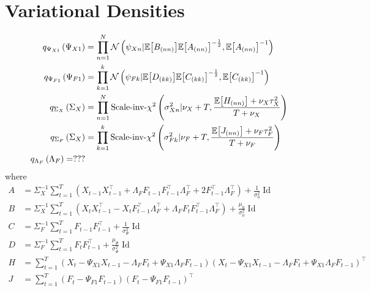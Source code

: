 \section{Variational Densities}
\begin{align}
	q_{\Psi_{X1}} \left( \Psi_{X1} \right) &= \prod_{n = 1}^N \mathcal N \left( \psi_{Xn} | \mathbb{E} \mleft[ B_{(nn)} \mright] \mathbb{E} \mleft[ A_{(nn)} \mright]^{-\frac12}, \mathbb{E} \mleft[ A_{(nn)} \mright]^{-1} \right) \\
	q_{\Psi_{F1}} \left( \Psi_{F1} \right) &= \prod_{k = 1}^k \mathcal N \left( \psi_{Fk} | \mathbb{E} \mleft[ D_{(kk)} \mright] \mathbb{E} \mleft[ C_{(kk)} \mright]^{-\frac12}, \mathbb{E} \mleft[ C_{(kk)} \mright]^{-1} \right) \\
	q_{\Sigma_X} \left( \Sigma_X \right) &= \prod_{n = 1}^N \text{Scale-inv-} \chi^2 \left( \sigma_{Xn}^2 | \nu_X + T, \frac{ \mathbb{E} \mleft[ H_{(nn)} \mright] + \nu_X \tau_X^2 }{ T + \nu_X } \right) \\
	q_{\Sigma_F} \left( \Sigma_X \right) &= \prod_{k = 1}^k \text{Scale-inv-} \chi^2 \left( \sigma_{Fk}^2 | \nu_F + T, \frac{ \mathbb{E} \mleft[ J_{(nn)} \mright] + \nu_F \tau_F^2 }{ T + \nu_F } \right) \\
	q_{\Lambda_F} \left( \Lambda_F \right) = ???
\end{align}
where 
\begin{align}
	A &= \Sigma_X^{-1} \sum_{t = 1}^T \left( X_{t-1} X_{t-1}^{\top} + \Lambda_F F_{t-1} F_{t-1}^{\top} \Lambda_F^{\top} + 2 F_{t-1}^{\top} \Lambda_F^{\top} \right) + \frac{1}{\sigma_0^2} \operatorname{Id} \\
	B &= \Sigma_X^{-1} \sum_{t = 1}^T \left( X_{t} X_{t-1}^{\top} - X_{t} F_{t-1}^{\top} \Lambda_F^{\top} + \Lambda_F F_{t} F_{t-1}^{\top} \Lambda_F^{\top} \right) + \frac{\mu_0}{\sigma_0^2}  \operatorname{Id} \\
	C &= \Sigma_F^{-1} \sum_{t = 1}^T F_{t-1} F_{t-1}^{\top} + \frac{1}{\sigma_{\Phi}^2} \operatorname{Id} \\
	D &= \Sigma_F^{-1} \sum_{t = 1}^T F_t F_{t-1}^\top + \frac{\mu_{\Phi}}{\sigma_{\Phi}^2} \operatorname{Id} \\
	H &=\sum_{t=1}^T \left( X_t - \Psi_{X1} X_{t-1} - \Lambda_F F_t + \Psi_{X1} \Lambda_F F_{t-1} \right)  \left( X_t - \Psi_{X1} X_{t-1} - \Lambda_F F_t + \Psi_{X1} \Lambda_F F_{t-1} \right)^{\top} \\
	J &= \sum_{t=1}^T \left( F_t - \Psi_{F1} F_{t-1} \right) \left( F_t - \Psi_{F1} F_{t-1} \right)^{\top}
\end{align}

